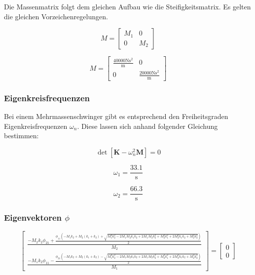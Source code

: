 \documentclass[
  letterpaper,
  DIV=11]{scrreprt}
\begin{document}
Die Massenmatrix folgt dem gleichen Aufbau wie die Steifigkeitsmatrix.
Es gelten die gleichen Vorzeichenregelungen.

\begin{equation}M = \left[\begin{matrix}M_{1} & 0\\0 & M_{2}\end{matrix}\right]\end{equation}

\begin{equation}M = \left[\begin{matrix}\frac{40000 \text{N} \text{s}^{2}}{\text{m}} & 0\\0 & \frac{20000 \text{N} \text{s}^{2}}{\text{m}}\end{matrix}\right]\end{equation}

\hypertarget{eigenkreisfrequenzen-1}{%
\subsubsection{Eigenkreisfrequenzen}\label{eigenkreisfrequenzen-1}}

Bei einem Mehrmassenschwinger gibt es entsprechend den Freiheitsgraden
Eigenkreisfrequenzen \(\omega_n\). Diese lassen sich anhand folgender
Gleichung bestimmen:

\[\det{[\mathbf{K}-\omega_n^2 \mathbf{M}]=0}\]

\begin{equation}\omega_{1} = \frac{33.1}{\text{s}}\end{equation}

\begin{equation}\omega_{2} = \frac{66.3}{\text{s}}\end{equation}

\hypertarget{eigenvektoren-phi}{%
\subsubsection{\texorpdfstring{Eigenvektoren
\(\phi\)}{Eigenvektoren \textbackslash phi}}\label{eigenvektoren-phi}}

\begin{equation}\left[\begin{matrix}\frac{- M_{2} k_{2} \phi_{21} + \frac{\phi_{11} \left(- M_{1} k_{2} + M_{2} \left(k_{1} + k_{2}\right) + \sqrt{M_{1}^{2} k_{2}^{2} - 2 M_{1} M_{2} k_{1} k_{2} + 2 M_{1} M_{2} k_{2}^{2} + M_{2}^{2} k_{1}^{2} + 2 M_{2}^{2} k_{1} k_{2} + M_{2}^{2} k_{2}^{2}}\right)}{2}}{M_{2}}\\\frac{- M_{1} k_{2} \phi_{11} - \frac{\phi_{21} \left(- M_{1} k_{2} + M_{2} \left(k_{1} + k_{2}\right) - \sqrt{M_{1}^{2} k_{2}^{2} - 2 M_{1} M_{2} k_{1} k_{2} + 2 M_{1} M_{2} k_{2}^{2} + M_{2}^{2} k_{1}^{2} + 2 M_{2}^{2} k_{1} k_{2} + M_{2}^{2} k_{2}^{2}}\right)}{2}}{M_{1}}\end{matrix}\right] = \left[\begin{matrix}0\\0\end{matrix}\right]\end{equation}
\end{document}
